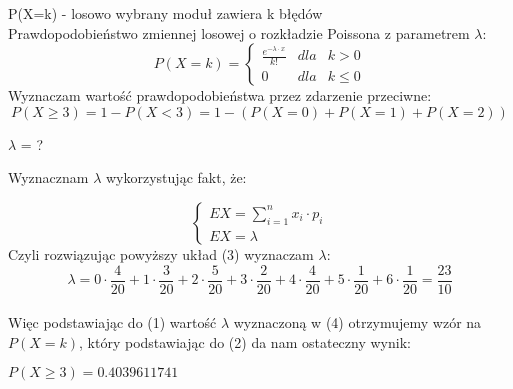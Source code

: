 \documentclass{article}
\begin{document}
\medskip 
{}  
\begin{flushleft}
P(X=k) - losowo wybrany moduł zawiera k błędów \\
Prawdopodobieństwo zmiennej losowej o rozkładzie Poissona z parametrem $\lambda$:
\begin{equation}
    P(X=k)=\left\{\begin{array}{rcl}
                     \frac{e^{-\lambda\cdot x}}{k!}&dla&k>0\\
                     0 & dla & k \le 0
\end{array}\right.
\end{equation}
Wyznaczam wartość prawdopodobieństwa przez zdarzenie przeciwne:\\
\begin{equation}
    P(X \ge 3)=1-P(X<3)=1-(P(X=0)+P(X=1)+P(X=2))
\end{equation}
\begin{center}
$\lambda$ = ?\\
\end{center}
\begin{flushleft}
Wyznacznam $\lambda$ wykorzystując fakt, że:\\
\end{flushleft}
\begin{equation}
\left\{\begin{array}{rcl}
EX=\sum_{i=1}^{n} x_i\cdot p_i\\
EX = \lambda
\end{array}\right.
\end{equation}
Czyli rozwiązując powyższy układ (3) wyznaczam $\lambda$:
\begin{equation}
\lambda = 0\cdot \frac{4}{20}+1\cdot \frac{3}{20}+2\cdot \frac{5}{20}+3\cdot \frac{2}{20}+4\cdot \frac{4}{20}+5\cdot \frac{1}{20}+6\cdot \frac{1}{20} = \frac{23}{10}
\end{equation}
\\
Więc podstawiając do (1) wartość $\lambda$ wyznaczoną w (4) otrzymujemy wzór na $P(X=k)$, który podstawiając do (2) da nam ostateczny wynik:\\ 
\begin{center}
$P(X\ge3)=0.4039611741$
\end{center}
\end{flushleft}
\end{document}
